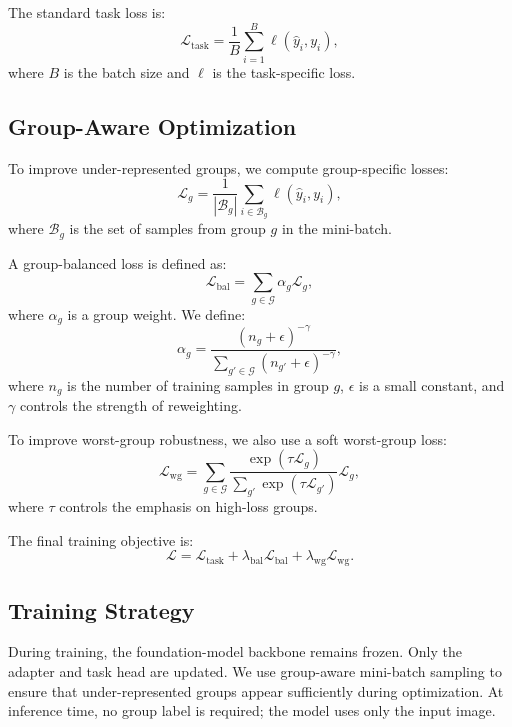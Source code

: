 \documentclass[10pt,twocolumn,letterpaper]{article}
\begin{document}
The standard task loss is:
\begin{equation}
\mathcal{L}_{\text{task}} =
\frac{1}{B}\sum_{i=1}^{B}
\ell(\hat{y}_i,y_i),
\end{equation}
where $B$ is the batch size and $\ell$ is the task-specific loss.

\subsection{Group-Aware Optimization}

To improve under-represented groups, we compute group-specific losses:
\begin{equation}
\mathcal{L}_{g} =
\frac{1}{|\mathcal{B}_g|}
\sum_{i \in \mathcal{B}_g}
\ell(\hat{y}_i,y_i),
\end{equation}
where $\mathcal{B}_g$ is the set of samples from group $g$ in the mini-batch.

A group-balanced loss is defined as:
\begin{equation}
\mathcal{L}_{\text{bal}} =
\sum_{g \in \mathcal{G}}
\alpha_g \mathcal{L}_g,
\end{equation}
where $\alpha_g$ is a group weight. We define:
\begin{equation}
\alpha_g = \frac{(n_g+\epsilon)^{-\gamma}}
{\sum_{g' \in \mathcal{G}}(n_{g'}+\epsilon)^{-\gamma}},
\end{equation}
where $n_g$ is the number of training samples in group $g$, $\epsilon$ is a small constant, and $\gamma$ controls the strength of reweighting.

To improve worst-group robustness, we also use a soft worst-group loss:
\begin{equation}
\mathcal{L}_{\text{wg}} =
\sum_{g \in \mathcal{G}}
\frac{\exp(\tau \mathcal{L}_g)}
{\sum_{g'} \exp(\tau \mathcal{L}_{g'})}
\mathcal{L}_g,
\end{equation}
where $\tau$ controls the emphasis on high-loss groups.

The final training objective is:
\begin{equation}
\mathcal{L} =
\mathcal{L}_{\text{task}}
+ \lambda_{\text{bal}}\mathcal{L}_{\text{bal}}
+ \lambda_{\text{wg}}\mathcal{L}_{\text{wg}}.
\end{equation}

\subsection{Training Strategy}

During training, the foundation-model backbone remains frozen. Only the adapter and task head are updated. We use group-aware mini-batch sampling to ensure that under-represented groups appear sufficiently during optimization. At inference time, no group label is required; the model uses only the input image.
\end{document}
